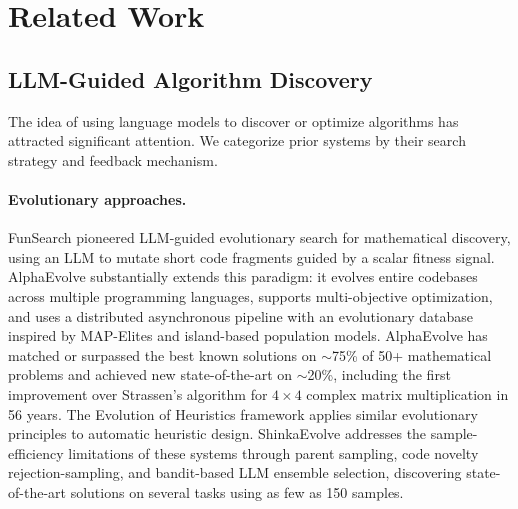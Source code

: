 \documentclass[11pt,a4paper]{article}
\begin{document}
\section{Related Work}
\label{sec:related}

\subsection{LLM-Guided Algorithm Discovery}

The idea of using language models to discover or optimize algorithms has attracted significant attention. We categorize prior systems by their search strategy and feedback mechanism.

\paragraph{Evolutionary approaches.}
FunSearch \citep{romera2024funsearch} pioneered LLM-guided evolutionary search for mathematical discovery, using an LLM to mutate short code fragments guided by a scalar fitness signal. AlphaEvolve \citep{novikov2025alphaevolve} substantially extends this paradigm: it evolves entire codebases across multiple programming languages, supports multi-objective optimization, and uses a distributed asynchronous pipeline with an evolutionary database inspired by MAP-Elites and island-based population models. AlphaEvolve has matched or surpassed the best known solutions on $\sim$75\% of 50+ mathematical problems and achieved new state-of-the-art on $\sim$20\%, including the first improvement over Strassen's algorithm for $4\times4$ complex matrix multiplication in 56 years. The Evolution of Heuristics framework \citep{liu2024eoh} applies similar evolutionary principles to automatic heuristic design. ShinkaEvolve \citep{lange2025shinka} addresses the sample-efficiency limitations of these systems through parent sampling, code novelty rejection-sampling, and bandit-based LLM ensemble selection, discovering state-of-the-art solutions on several tasks using as few as 150 samples.
\end{document}
